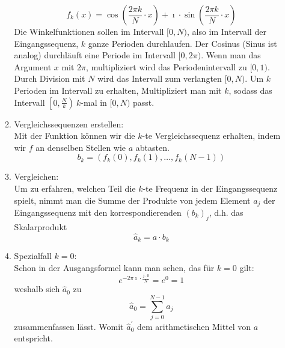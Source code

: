 \begin{itemize}
\begin{enumerate}
		\[f_k(x) = \cos\left(\frac{2\pi k}{N}\cdot x\right) + \imath \cdot\sin\left(\frac{2\pi k}{N}\cdot x\right) \]
		Die Winkelfunktionen sollen im Intervall \([0,N)\), also im Intervall der Eingangssequenz, \(k\) ganze Perioden durchlaufen. Der Cosinus (Sinus ist analog) durchläuft eine Periode im Intervall \([0,2\pi)\). Wenn man das Argument \(x\) mit \(2\pi\), multipliziert wird das Periodenintervall zu \([0,1)\). Durch Division mit \(N\) wird das Intervall zum verlangten \([0,N)\). Um \(k\) Perioden im Intervall zu erhalten, Multipliziert man mit \(k\), sodass das Intervall \(\left[0,\frac{N}{k}\right) ~k\)-mal in \([0,N)\) passt.
		\item Vergleichssequenzen erstellen:\\
		Mit der Funktion können wir die \(k\)-te Vergleichssequenz erhalten, indem wir \(f\) an denselben Stellen wie \(a\) abtasten.
		\[b_k = \left(f_k(0),f_k(1),\dots,f_k(N-1)\right) \]
		\item Vergleichen:\\
		Um zu erfahren, welchen Teil die \(k\)-te Frequenz in der Eingangssequenz spielt, nimmt man die Summe der Produkte von jedem Element \(a_j\) der Eingangssequenz mit den korrespondierenden \({(b_k)}_j\), d.h. das Skalarprodukt
		\[\hat{a}_k = a \cdot b_k\]
		\item Spezialfall \(k = 0\):\\
		Schon in der Ausgangsformel kann man sehen, das	für \(k = 0\) gilt: \[e^{-2\pi \imath \cdot\frac{j\cdot 0}{N}} = e^0 = 1\]
		weshalb sich \(\hat{a}_0\) zu
		\[\hat{a}_0 = \sum_{j=0}^{N-1} a_j\] zusammenfassen lässt. Womit \(\hat{a}^\prime_0 \) dem arithmetischen Mittel von \(a\) entspricht.
	\end{enumerate}
\end{itemize}
